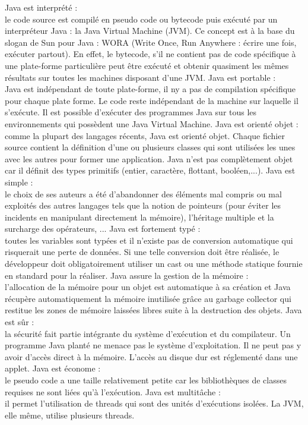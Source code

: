 \begin{itemize}
	\itemcheck Java est interprété	: \\
	le code source est compilé en pseudo code ou bytecode puis exécuté par un interpréteur Java : la Java Virtual Machine (JVM). Ce concept est à la base du slogan de Sun pour Java : WORA (Write Once, Run Anywhere : écrire une fois, exécuter partout). En effet, le bytecode, s'il ne contient pas de code spécifique à une plate-forme particulière peut être exécuté et obtenir quasiment les mêmes résultats sur toutes les machines disposant d'une JVM.
	\itemcheck Java est portable : \\
	Java est indépendant de toute plate-forme, il ny a pas de compilation spécifique pour chaque plate forme. Le code reste indépendant de la machine sur laquelle il s'exécute. Il est possible d'exécuter des programmes Java sur tous les environnements qui possèdent une Java Virtual Machine.
	\itemcheck Java est orienté objet :	\\
	comme la plupart des langages récents, Java est orienté objet. Chaque fichier source contient la définition d'une ou plusieurs classes qui sont utilisées les unes avec les autres pour former une application. Java n'est pas complètement objet car il définit des types primitifs (entier, caractère, flottant, booléen,...).
	\itemcheck Java est simple	: \\
	le choix de ses auteurs a été d'abandonner des éléments mal compris ou mal exploités des autres langages tels que la notion de pointeurs (pour éviter les incidents en manipulant directement la mémoire), l'héritage multiple et la surcharge des opérateurs, ...
	\itemcheck Java est fortement typé	: \\
	toutes les variables sont typées et il n'existe pas de conversion automatique qui risquerait une perte de données. Si une telle conversion doit être réalisée, le développeur doit obligatoirement utiliser un cast ou une méthode statique fournie en standard pour la réaliser.
	\itemcheck Java assure la gestion de la mémoire : \\
	l'allocation de la mémoire pour un objet est automatique à sa création et Java récupère automatiquement la mémoire inutilisée grâce au garbage collector qui restitue les zones de mémoire laissées libres suite à la destruction des objets.
	\itemcheck Java est sûr : \\
	la sécurité fait partie intégrante du système d'exécution et du compilateur. Un programme Java planté ne menace pas le système d'exploitation. Il ne peut pas y avoir d'accès direct à la mémoire. L'accès au disque dur est réglementé dans une applet. 
	\itemcheck Java est économe : \\
	le pseudo code a une taille relativement petite car les bibliothèques de classes requises ne sont liées qu'à l'exécution.
	\itemcheck Java est multitâche :\\
	il permet l'utilisation de threads qui sont des unités d'exécutions isolées. La JVM, elle même, utilise plusieurs threads.
\end{itemize}
